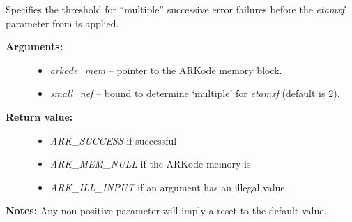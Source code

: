 \documentclass[letterpaper,10pt,english]{sphinxmanual}
\begin{document}
\begin{fulllineitems}
\label{c_interface/User_callable:c.ARKodeSetSmallNumEFails}
Specifies the threshold for ``multiple'' successive error failures
before the \emph{etamxf} parameter from
{\hyperref[c_interface/User_callable:c.ARKodeSetMaxEFailGrowth]{\emph{}}} is applied.
\begin{description}
\item[{\textbf{Arguments:}}] \leavevmode\begin{itemize}
\item {} 
\emph{arkode\_mem} -- pointer to the ARKode memory block.

\item {} 
\emph{small\_nef} -- bound to determine `multiple' for \emph{etamxf} (default is 2).

\end{itemize}

\item[{\textbf{Return value:}}] \leavevmode\begin{itemize}
\item {} 
\emph{ARK\_SUCCESS} if successful

\item {} 
\emph{ARK\_MEM\_NULL} if the ARKode memory is 

\item {} 
\emph{ARK\_ILL\_INPUT} if an argument has an illegal value

\end{itemize}

\end{description}

\textbf{Notes:} Any non-positive parameter will imply a reset to the default value.

\end{fulllineitems}

\end{document}

